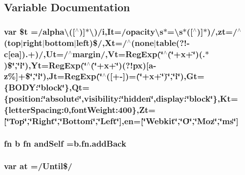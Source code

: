 \subsection{Variable Documentation}
\hypertarget{jquery-1_89_81_8min_8js_a5a188274831b027a2be077bb2a5826e9}{
\subsubsection[{\$t}]{\setlength{\rightskip}{0pt plus 5cm}var \${\bf t} =/alpha\textbackslash{}(\mbox{[}$^\wedge$)\mbox{]}$\ast$\textbackslash{})/{\bf i},It=/{\bf opacity\textbackslash{}s}$\ast$=\textbackslash{}{\bf s}$\ast$(\mbox{[}$^\wedge$)\mbox{]}$\ast$)/,zt=/$^\wedge$(top$\vert$right$\vert$bottom$\vert$left)\$/,Xt=/$^\wedge$(none$\vert$table(?!-\/{\bf c}\mbox{[}ea\mbox{]}).+)/,Ut=/$^\wedge$margin/,Vt=Reg\-Exp(\char`\"{}$^\wedge$(\char`\"{}+{\bf x}+\char`\"{})(.$\ast$)\$\char`\"{},\char`\"{}i\char`\"{}),Yt=Reg\-Exp(\char`\"{}$^\wedge$(\char`\"{}+{\bf x}+\char`\"{})(?!px)\mbox{[}{\bf a}-\/z\%\mbox{]}+\$\char`\"{},\char`\"{}{\bf i}\char`\"{}),Jt=Reg\-Exp(\char`\"{}$^\wedge$(\mbox{[}+-\/\mbox{]})=(\char`\"{}+{\bf x}+\char`\"{})\char`\"{},\char`\"{}i\char`\"{}),Gt=\{B\-O\-D\-Y\-:\char`\"{}block\char`\"{}\},Qt=\{position\-:\char`\"{}absolute\char`\"{},visibility\-:\char`\"{}hidden\char`\"{},display\-:\char`\"{}block\char`\"{}\},Kt=\{letter\-Spacing\-:0,font\-Weight\-:400\},Zt=\mbox{[}\char`\"{}Top\char`\"{},\char`\"{}{\bf Right}\char`\"{},\char`\"{}{\bf Bottom}\char`\"{},\char`\"{}{\bf Left}\char`\"{}\mbox{]},en=\mbox{[}\char`\"{}Webkit\char`\"{},\char`\"{}O\char`\"{},\char`\"{}Moz\char`\"{},\char`\"{}ms\char`\"{}\mbox{]}}}\label{jquery-1_89_81_8min_8js_a5a188274831b027a2be077bb2a5826e9}
\hypertarget{jquery-1_89_81_8min_8js_af9b6517fdd596f200afda7492c96391b}{
\subsubsection[{and\-Self}]{ {\bf fn} {\bf b} {\bf fn} and\-Self =b.\-fn.\-add\-Back}}\label{jquery-1_89_81_8min_8js_af9b6517fdd596f200afda7492c96391b}
\hypertarget{jquery-1_89_81_8min_8js_abe3e4a2a54ed6e49b6130fc5e7084868}{
\subsubsection[{at}]{\setlength{\rightskip}{0pt plus 5cm}var at =/Until\$/}}\label{jquery-1_89_81_8min_8js_abe3e4a2a54ed6e49b6130fc5e7084868}
